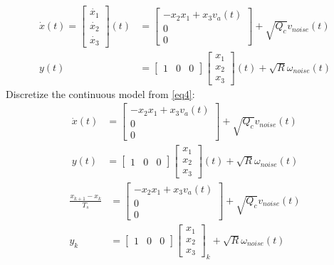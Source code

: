 \documentclass[12pt,a4paper]{article}
\begin{document}
	\begin{equation}
		\boxed{\begin{split}
				\dot{x}(t) =
				\begin{bmatrix}
					\dot{x_1} \\
					\dot{x_2} \\
					\dot{x_3} 
				\end{bmatrix}(t) &=
				\begin{bmatrix}
					-x_2 x_1 + x_3 v_a(t) \\
					0                     \\
					0                     
				\end{bmatrix} +\sqrt{Q_c}v_{noise}(t)\\
				y(t) &= 
				\begin{bmatrix}
					1 & 0 & 0 
				\end{bmatrix}
				\begin{bmatrix}
					x_1 \\
					x_2 \\
					x_3 
				\end{bmatrix}(t)+\sqrt{R}\omega_{noise}(t)
		\end{split}}
		\label{eq4}
	\end{equation}
	Discretize the continuous model from \autoref{eq4}:
	\begin{equation}
		\begin{split}
			\dot{x}(t) &=
			\begin{bmatrix}
				-x_2 x_1 + x_3 v_a(t) \\
				0                     \\
				0                     
			\end{bmatrix} +\sqrt{Q_c}v_{noise}(t)\\
			y(t) &= 
			\begin{bmatrix}
				1 & 0 & 0 
			\end{bmatrix}
			\begin{bmatrix}
				x_1 \\
				x_2 \\
				x_3 
			\end{bmatrix}(t)+\sqrt{R}\omega_{noise}(t)
		\end{split}
		\label{eq5}
	\end{equation}
	\begin{equation}
		\begin{split}
			\frac{x_{k+1} - x_k}{T_s} &=
			\begin{bmatrix}
				-x_2 x_1 + x_3 v_a(t) \\
				0                     \\
				0                     
			\end{bmatrix} +\sqrt{Q_c}v_{noise}(t)\\
			y_k &= 
			\begin{bmatrix}
				1 & 0 & 0 
			\end{bmatrix}
			\begin{bmatrix}
				x_1 \\
				x_2 \\
				x_3 
			\end{bmatrix}_k+\sqrt{R}\omega_{noise}(t)
		\end{split}
		\label{eq6}
	\end{equation}
\end{document}
